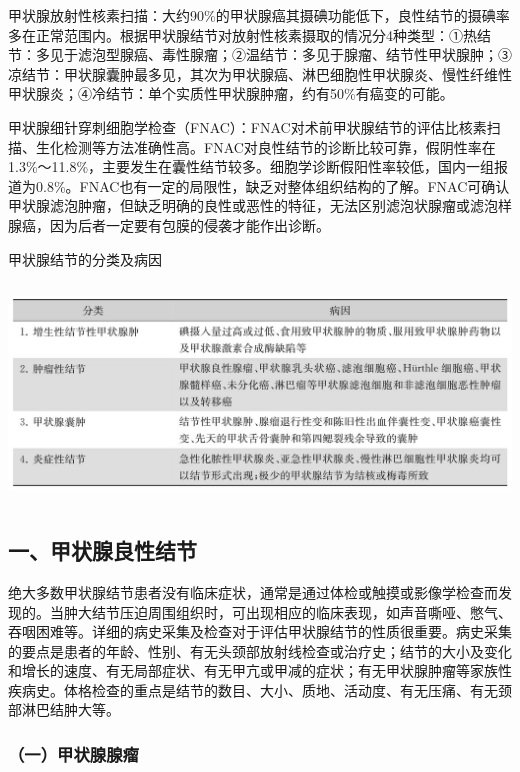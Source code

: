 甲状腺放射性核素扫描：大约90\%的甲状腺癌其摄碘功能低下，良性结节的摄碘率多在正常范围内。根据甲状腺结节对放射性核素摄取的情况分4种类型：①热结节：多见于滤泡型腺癌、毒性腺瘤；②温结节：多见于腺瘤、结节性甲状腺肿；③凉结节：甲状腺囊肿最多见，其次为甲状腺癌、淋巴细胞性甲状腺炎、慢性纤维性甲状腺炎；④冷结节：单个实质性甲状腺肿瘤，约有50\%有癌变的可能。

甲状腺细针穿刺细胞学检查（FNAC）：FNAC对术前甲状腺结节的评估比核素扫描、生化检测等方法准确性高。FNAC对良性结节的诊断比较可靠，假阴性率在1.3\%～11.8\%，主要发生在囊性结节较多。细胞学诊断假阳性率较低，国内一组报道为0.8\%。FNAC也有一定的局限性，缺乏对整体组织结构的了解。FNAC可确认甲状腺滤泡肿瘤，但缺乏明确的良性或恶性的特征，无法区别滤泡状腺瘤或滤泡样腺癌，因为后者一定要有包膜的侵袭才能作出诊断。

\begin{table}[htbp]
\centering
\caption{甲状腺结节的分类及病因}
\label{tab38-4}
\includegraphics[width=5.9375in,height=2.28125in]{./images/Image00241.jpg}
\end{table}

\subsection{一、甲状腺良性结节}

绝大多数甲状腺结节患者没有临床症状，通常是通过体检或触摸或影像学检查而发现的。当肿大结节压迫周围组织时，可出现相应的临床表现，如声音嘶哑、憋气、吞咽困难等。详细的病史采集及检查对于评估甲状腺结节的性质很重要。病史采集的要点是患者的年龄、性别、有无头颈部放射线检查或治疗史；结节的大小及变化和增长的速度、有无局部症状、有无甲亢或甲减的症状；有无甲状腺肿瘤等家族性疾病史。体格检查的重点是结节的数目、大小、质地、活动度、有无压痛、有无颈部淋巴结肿大等。

\subsubsection{（一）甲状腺腺瘤}

